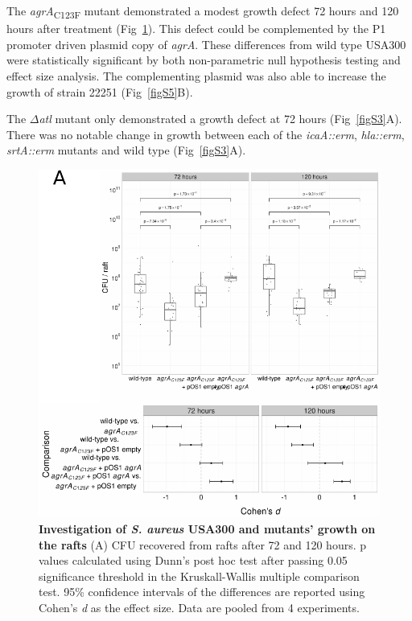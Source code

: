 \documentclass[10pt,letterpaper]{article}
\begin{document}
The \textit{agrA}\textsubscript{C123F} mutant demonstrated a modest growth defect 72 hours and 120 hours after treatment (Fig~\ref{fig3}).
This defect could be complemented by the P1 promoter driven plasmid copy of \textit{agrA}.
These differences from wild type USA300 were statistically significant by both non-parametric null hypothesis testing and effect size analysis.
The complementing plasmid was also able to increase the growth of strain 22251 (Fig~\ref{figS5}B). 

The $\Delta$\textit{atl} mutant only demonstrated a growth defect at 72 hours (Fig~\ref{figS3}A).
There was no notable change in growth between each of the \textit{icaA::erm}, \textit{hla::erm}, \textit{srtA::erm} mutants and wild type (Fig~\ref{figS3}A).


\begin{figure}[!ht]
\begin{adjustwidth}{-2.25in}{0in}
\includegraphics[width=0.85\paperwidth]{Figures/fig3.pdf}
\caption[Investigation of \textit{S. aureus} USA300 and mutants' growth on the rafts]{
	\textbf{Investigation of \textit{S. aureus} USA300 and mutants' growth on the rafts}
	(A) CFU recovered from rafts after 72 and 120 hours. p values calculated using Dunn's post hoc test after passing 0.05 significance threshold in the Kruskall-Wallis multiple comparison test. 95\% confidence intervals of the differences are reported using Cohen's \textit{d} as the effect size. Data are pooled from 4 experiments.}
	\label{fig3}
    \end{adjustwidth}
\end{figure}
\end{document}
